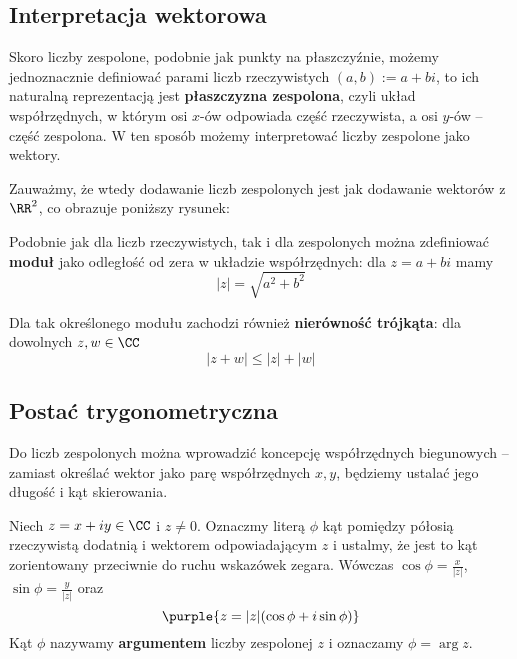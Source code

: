 \subsection{Interpretacja wektorowa}

Skoro liczby zespolone, podobnie jak punkty na płaszczyźnie, możemy jednoznacznie definiować parami liczb rzeczywistych $(a, b) := a + bi$, to ich naturalną reprezentacją jest \textbf{płaszczyzna zespolona}, czyli układ współrzędnych, w którym osi $x$-ów odpowiada część rzeczywista, a osi $y$-ów -- część zespolona. W ten sposób możemy interpretować liczby zespolone jako wektory.

Zauważmy, że wtedy dodawanie liczb zespolonych jest jak dodawanie wektorów z $\RR^2$, co obrazuje poniższy rysunek:

\begin{center}
\end{center}

Podobnie jak dla liczb rzeczywistych, tak i dla zespolonych można zdefiniować \textbf{moduł} jako odległość od zera w układzie współrzędnych: dla $z = a + bi$ mamy
$$|z| = \sqrt{a^2 + b^2}$$

Dla tak określonego modułu zachodzi również \textbf{nierówność trójkąta}: dla dowolnych $z, w \in \CC$
$$|z + w| \leq |z| + |w|$$

\subsection{Postać trygonometryczna}

Do liczb zespolonych można wprowadzić koncepcję współrzędnych biegunowych -- zamiast określać wektor jako parę współrzędnych $x, y$, będziemy ustalać jego długość i kąt skierowania.

Niech $z=x+iy\in\CC$ i $z\neq0$. Oznaczmy literą $\phi$ kąt pomiędzy półosią rzeczywistą dodatnią i wektorem odpowiadającym $z$ i ustalmy, że jest to kąt zorientowany przeciwnie do ruchu wskazówek zegara. Wówczas $\cos\phi = \frac{x}{|z|}$, $\sin\phi = \frac{y}{|z|}$ oraz
$$
\purple{z = |z|(\cos\phi + i\sin\phi)}
$$
Kąt $\phi$ nazywamy \textbf{argumentem} liczby zespolonej $z$ i oznaczamy $\phi = \arg z$.

